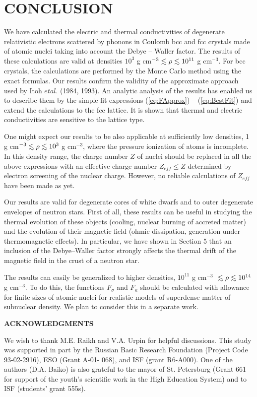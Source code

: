 \section{CONCLUSION}
We have calculated the electric and thermal conductivities 
of degenerate relativistic electrons scattered by phonons 
in Coulomb bcc and fcc crystals made of atomic nuclei
taking into account the Debye -- Waller factor.
The results of these calculations are valid at
densities $10^3$ g cm$^{-3}  \la \rho \la 10^{11}$ g cm$^{-3}$. 
For bcc crystals, the calculations are performed by the Monte Carlo
method using the exact formulas. Our results confirm
the validity of the approximate approach used by Itoh $et al.$ 
(1984, 1993). An analytic analysis of the results has enabled
us to describe them by the simple fit expressions
(\ref{eq:FApprox}) -- (\ref{eq:BestFit}) and extend the
calculations to the fcc lattice. It is shown that thermal and
electric conductivities are sensitive to the lattice type.

One might expect our results to be also applicable at
sufficiently low densities, 1  g cm$^{-3} \la \rho \la 10^3$ g cm$^{-3}$, 
where the pressure ionization of atoms is incomplete. 
In this density range, the charge number $Z$ of nuclei should 
be replaced in all the above expressions with an effective 
charge number $Z_{eff} \le Z$ determined by electron
screening of the nuclear charge. However, no reliable calculations
of $Z_{eff}$ have been made as yet.

Our results are valid for degenerate cores of white dwarfs and
to outer degenerate envelopes of neutron stars. First of all, 
these results can be useful in studying the thermal evolution 
of these objects (cooling, nuclear burning of accreted matter) 
and the evolution of their magnetic field (ohmic dissipation, 
generation under thermomagnetic effects). In particular,
we have shown in Section 5 that an inclusion of
the Debye--Waller factor strongly affects the thermal
drift of the magnetic field in the crust of a neutron star.

The results can easily be generalized to higher densities, 
$10^{11}$ g cm$^{-3}$ $ \la \rho \la 10^{14}$  g cm$^{-3}$.
To do this, the functions $F_\sigma$ and $F_\kappa$
should be calculated with allowance for finite sizes of
atomic nuclei for realistic models of superdense matter of
subnuclear density. We plan to consider this in a separate work.

\begin{center}
                 {\bf ACKNOWLEDGMENTS}
\end{center}
%
We wish to thank M.E. Raikh and V.A. Urpin for helpful
discussions. This study was supported in part by the
Russian Basic Research Foundation (Project Code 93-02-2916), ESO
(Grant A-01- 068), and ISF (grant R6-A000). One of the authors
(D.A. Baiko) is also grateful to the mayor of St. Petersburg (Grant
661 for support of the youth's scientific work in the High
Education System) and to ISF (students' grant 555s).

